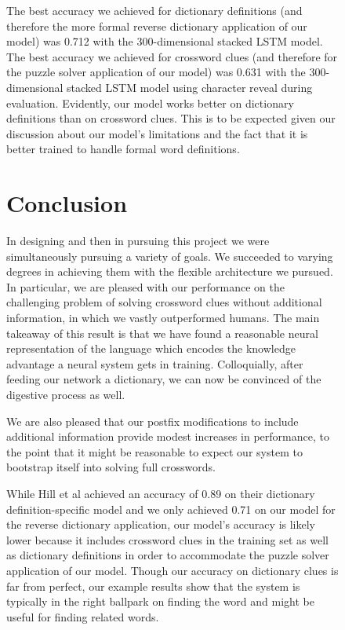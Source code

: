 \documentclass{article} %
\begin{document}
\begin{figure}
The best accuracy we achieved for dictionary definitions (and therefore the more formal reverse dictionary application of our model) was 0.712 with the 300-dimensional stacked LSTM model. The best accuracy we achieved for crossword clues (and therefore for the puzzle solver application of our model) was 0.631 with the 300-dimensional stacked LSTM model using character reveal during evaluation. 
Evidently, our model works better on dictionary definitions than on crossword clues. This is to be expected given our discussion about our model’s limitations and the fact that it is better trained to handle formal word definitions. 


\section{Conclusion}
In designing and then in pursuing this project we were simultaneously pursuing a variety of goals. We succeeded to varying degrees in achieving them with the flexible architecture we pursued. In particular, we are pleased with our performance on the challenging problem of solving crossword clues without additional information, in which we vastly outperformed humans. The main takeaway of this result is that we have found a reasonable neural representation of the language which encodes the knowledge advantage a neural system gets in training. Colloquially, after feeding our network a dictionary, we can now be convinced of the digestive process as well.

We are also pleased that our postfix modifications to include additional information provide modest increases in performance, to the point that it might be reasonable to expect our system to bootstrap itself into solving full crosswords. 

While Hill et al achieved an accuracy of 0.89 on their dictionary definition-specific model and we only achieved 0.71 on our model for the reverse dictionary application, our model’s accuracy is likely lower because it includes crossword clues in the training set as well as dictionary definitions in order to accommodate the puzzle solver application of our model. Though our accuracy on dictionary clues is far from perfect, our example results show that the system is typically in the right ballpark on finding the word and might be useful for finding related words. 


\end{figure}
\end{document}
